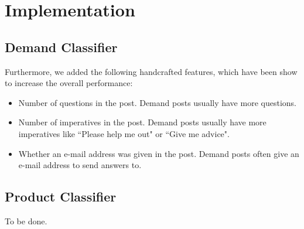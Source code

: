 
\section{Implementation}
\label{sec:implementation}

\subsection{Demand Classifier}

Furthermore, we added the following handcrafted features, which have been show to increase the overall performance:
\begin{itemize}
	\item Number of questions in the post. Demand posts usually have more questions.
	\item Number of imperatives in the post. Demand posts usually have more imperatives like ``Please help me out" or ``Give me advice".
	\item Whether an e-mail address was given in the post. Demand posts often give an e-mail address to send answers to.
\end{itemize}

\subsection{Product Classifier}
To be done.
